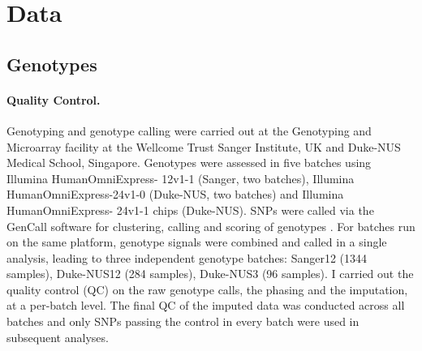 \section{Data}
\subsection{Genotypes}
\label{subsection:genotypes}
\paragraph{Quality Control.} Genotyping and genotype calling were carried out at the Genotyping and Microarray facility at the Wellcome Trust Sanger Institute, UK and Duke-NUS Medical School, Singapore. Genotypes were assessed in five batches using Illumina HumanOmniExpress- 12v1-1 (Sanger, two batches), Illumina HumanOmniEx\-press-24v1-0 (Duke-NUS, two batches) and Illumina HumanOmniExpress- 24v1-1 chips (Duke-NUS). SNPs were called via the GenCall software for clustering, calling and scoring of genotypes \citep{Teo2007}. For batches run on the same platform, genotype signals were combined and called in a single analysis, leading to three independent genotype batches: Sanger12 (\num{1344} samples), Duke-NUS12 (\num{284} samples), Duke-NUS3 (\num{96} samples). I carried out the quality control (QC) on the raw genotype calls, the phasing and the imputation, at a per-batch level. The final QC of the imputed data was conducted across all batches and only SNPs passing the control in every batch were used in subsequent analyses. 

